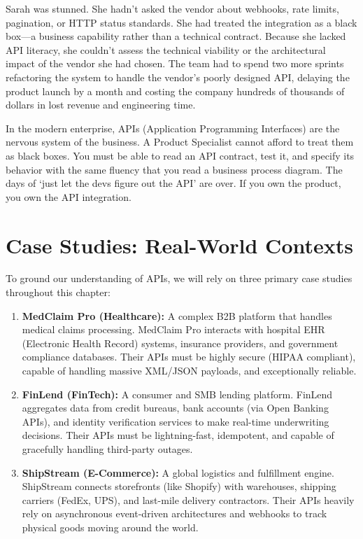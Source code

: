 Sarah was stunned. She hadn't asked the vendor about webhooks, rate
limits, pagination, or HTTP status standards. She had treated the
integration as a black box---a business capability rather than a
technical contract. Because she lacked API literacy, she couldn't assess
the technical viability or the architectural impact of the vendor she
had chosen. The team had to spend two more sprints refactoring the
system to handle the vendor's poorly designed API, delaying the product
launch by a month and costing the company hundreds of thousands of
dollars in lost revenue and engineering time.

In the modern enterprise, APIs (Application Programming Interfaces) are
the nervous system of the business. A Product Specialist cannot afford
to treat them as black boxes. You must be able to read an API contract,
test it, and specify its behavior with the same fluency that you read a
business process diagram. The days of `just let the devs figure out the
API' are over. If you own the product, you own the API integration.

\section{Case Studies: Real-World
Contexts}\label{case-studies-real-world-contexts}

To ground our understanding of APIs, we will rely on three primary case
studies throughout this chapter:

\begin{enumerate}
\def\labelenumi{\arabic{enumi}.}
\tightlist
\item
  \textbf{MedClaim Pro (Healthcare):} A complex B2B platform that
  handles medical claims processing. MedClaim Pro interacts with
  hospital EHR (Electronic Health Record) systems, insurance providers,
  and government compliance databases. Their APIs must be highly secure
  (HIPAA compliant), capable of handling massive XML/JSON payloads, and
  exceptionally reliable.
\item
  \textbf{FinLend (FinTech):} A consumer and SMB lending platform.
  FinLend aggregates data from credit bureaus, bank accounts (via Open
  Banking APIs), and identity verification services to make real-time
  underwriting decisions. Their APIs must be lightning-fast, idempotent,
  and capable of gracefully handling third-party outages.
\item
  \textbf{ShipStream (E-Commerce):} A global logistics and fulfillment
  engine. ShipStream connects storefronts (like Shopify) with
  warehouses, shipping carriers (FedEx, UPS), and last-mile delivery
  contractors. Their APIs heavily rely on asynchronous event-driven
  architectures and webhooks to track physical goods moving around the
  world.
\end{enumerate}

